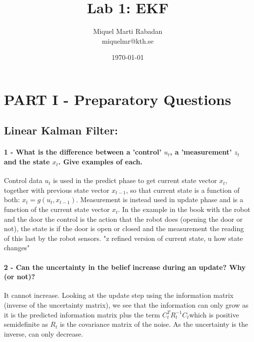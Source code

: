 \documentclass[12pt]{article}
\title{Lab 1: EKF}
\author{
        Miquel Marti Rabadan\\
        miquelmr@kth.se
}
\date{\today}
\begin{document}
\maketitle



\section{PART I - Preparatory Questions}
\subsection{Linear Kalman Filter:}
\paragraph{1 - What is the difference between a 'control' \(u_t\), a 'measurement' \(z_t\) and the
state \(x_t\). Give examples of each.} 
Control data \(u_t\) is used in the predict phase to get current state vector \(x_t\), together with  previous state vector \(x_{t-1}\), so that current state is a function of both: \(x_t=g(u_t,x_{t-1})\). Measurement is instead used in update phase and is a function of the current state vector \(x_t\). In the example in the book with the robot and the door the control is the action that the robot does (opening the door or not), the state is if the door is open or closed and the measurement the reading of this last by the robot sensors. "z refined version of current state, u how state changes"
\paragraph{2 - Can the uncertainty in the belief increase during an update? Why (or not)?}
It cannot increase. Looking at the update step using the information matrix (inverse of the uncertainty matrix), we see that the information can only grow as it is the predicted information matrix plus the term \( C^T_tR_t^{-1}C_t\)which is positive semidefinite as \(R_t\) is the covariance matrix of the noise. As the uncertainty is the inverse, can only decrease.
\end{document}
